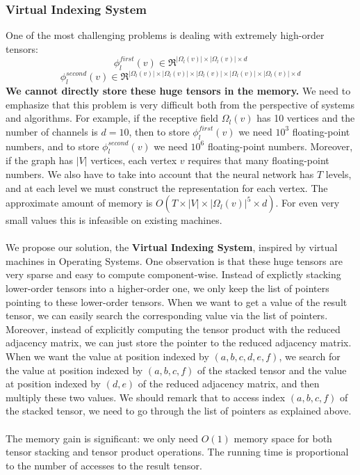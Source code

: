\documentclass[a4paper]{article}
\begin{document}
\subsubsection{Virtual Indexing System}

One of the most challenging problems is dealing with extremely high-order tensors:
$$\phi_l^{first}(v) \in \Re^{|\Omega_l(v)| \times |\Omega_l(v)| \times d}$$
$$\phi_l^{second}(v) \in \Re^{|\Omega_l(v)| \times |\Omega_l(v)| \times|\Omega_l(v)| \times |\Omega_l(v)| \times |\Omega_l(v)| \times d}$$
\textbf{\color{red} We cannot directly store these huge tensors in the memory.} We need to emphasize that this problem is very difficult both from the perspective of systems and algorithms. For example, if the receptive field $\Omega_l(v)$ has 10 vertices and the number of channels is $d = 10$, then to store $\phi_l^{first}(v)$ we need $10^3$ floating-point numbers, and to store $\phi_l^{second}(v)$ we need $10^6$ floating-point numbers. Moreover, if the graph has $|V|$ vertices, each vertex $v$ requires that many floating-point numbers. We also have to take into account that the neural network has $T$ levels, and at each level we must construct the representation for each vertex. The approximate amount of memory is $O(T \times |V| \times |\Omega_l(v)|^5 \times d)$. For even very small values this is infeasible on existing machines. \\ \\
We propose our solution, the \textbf{\color{red} Virtual Indexing System}, inspired by virtual machines in Operating Systems. One observation is that these huge tensors are very sparse and easy to compute component-wise. Instead of explictly stacking lower-order tensors into a higher-order one, we only keep the list of pointers pointing to these lower-order tensors. When we want to get a value of the result tensor, we can easily search the corresponding value via the list of pointers. Moreover, instead of explicitly computing the tensor product with the reduced adjacency matrix, we can just store the pointer to the reduced adjacency matrix. When we want the value at position indexed by $(a, b, c, d, e, f)$, we search for the value at position indexed by $(a, b, c, f)$ of the stacked tensor and the value at position indexed by $(d, e)$ of the reduced adjacency matrix, and then multiply these two values. We should remark that to access index $(a, b, c, f)$ of the stacked tensor, we need to go through the list of pointers as explained above. \\ \\
The memory gain is significant: we only need $O(1)$ memory space for both tensor stacking and tensor product operations. The running time is proportional to the number of accesses to the result tensor.
\end{document}
